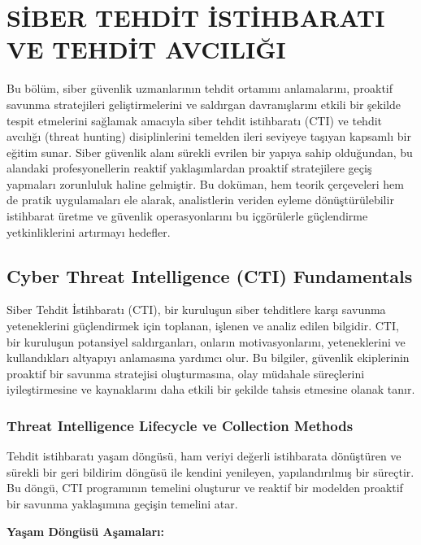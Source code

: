 \chapter{SİBER TEHDİT İSTİHBARATI VE TEHDİT AVCILIĞI}

Bu bölüm, siber güvenlik uzmanlarının tehdit ortamını anlamalarını, proaktif savunma stratejileri geliştirmelerini ve saldırgan davranışlarını etkili bir şekilde tespit etmelerini sağlamak amacıyla siber tehdit istihbaratı (CTI) ve tehdit avcılığı (threat hunting) disiplinlerini temelden ileri seviyeye taşıyan kapsamlı bir eğitim sunar. Siber güvenlik alanı sürekli evrilen bir yapıya sahip olduğundan, bu alandaki profesyonellerin reaktif yaklaşımlardan proaktif stratejilere geçiş yapmaları zorunluluk haline gelmiştir. Bu doküman, hem teorik çerçeveleri hem de pratik uygulamaları ele alarak, analistlerin veriden eyleme dönüştürülebilir istihbarat üretme ve güvenlik operasyonlarını bu içgörülerle güçlendirme yetkinliklerini artırmayı hedefler.

\section{Cyber Threat Intelligence (CTI) Fundamentals}
Siber Tehdit İstihbaratı (CTI), bir kuruluşun siber tehditlere karşı savunma yeteneklerini güçlendirmek için toplanan, işlenen ve analiz edilen bilgidir. CTI, bir kuruluşun potansiyel saldırganları, onların motivasyonlarını, yeteneklerini ve kullandıkları altyapıyı anlamasına yardımcı olur. Bu bilgiler, güvenlik ekiplerinin proaktif bir savunma stratejisi oluşturmasına, olay müdahale süreçlerini iyileştirmesine ve kaynaklarını daha etkili bir şekilde tahsis etmesine olanak tanır.

\subsection{Threat Intelligence Lifecycle ve Collection Methods}

Tehdit istihbaratı yaşam döngüsü, ham veriyi değerli istihbarata dönüştüren ve sürekli bir geri bildirim döngüsü ile kendini yenileyen, yapılandırılmış bir süreçtir. Bu döngü, CTI programının temelini oluşturur ve reaktif bir modelden proaktif bir savunma yaklaşımına geçişin temelini atar.

\textbf{Yaşam Döngüsü Aşamaları:}

